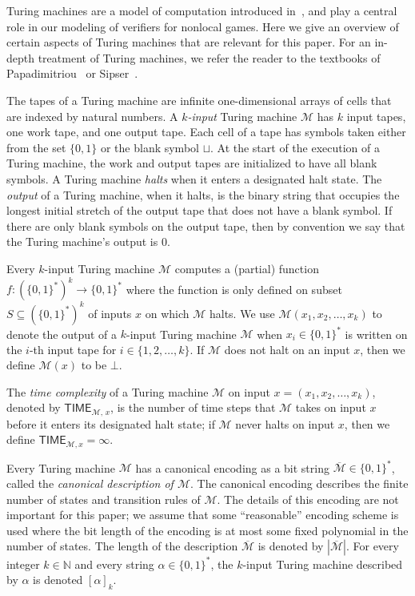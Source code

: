 \documentclass[11pt]{article}
\theoremstyle{definition}
\newcommand{\N}{\ensuremath{\mathbb{N}}}
\newcommand{\desc}[1]{\overline{\cal{#1}}}
\newcommand{\machine}{\cal{M}}
\renewcommand{\cal}[1]{\mathcal{#1}}
\newcommand{\TIME}{\mathsf{TIME}}
\begin{document}
Turing machines are a model of computation introduced
in~\cite{turing1937computable}, and play a central role in our modeling of verifiers for nonlocal
games. Here we give an overview of certain aspects of Turing machines that are relevant for
this paper. For an in-depth treatment of Turing machines, we refer the reader to the textbooks of 
Papadimitriou~\cite{Pap94} or Sipser~\cite{sipser2012introduction}.

The tapes of a Turing machine are infinite one-dimensional arrays of cells that
are indexed by natural numbers.
A \emph{$k$-input} Turing machine $\cal{M}$ has $k$ input tapes, one work tape,
and one output tape. 
Each cell of a tape has symbols taken either from the set $\{0,1\}$ or the blank
symbol $\sqcup$.
At the start of the execution of a Turing machine, the work and output tapes are
initialized to have all blank symbols.
A Turing machine \emph{halts} when it enters a designated halt state.
The \emph{output} of a Turing machine, when it halts, is the binary string that
occupies the longest initial stretch of the output tape that does not have a
blank symbol.
If there are only blank symbols on the output tape, then by convention we say
that the Turing machine's output is $0$.

Every $k$-input Turing machine $\cal{M}$ computes a (partial) function $f: (\{0,
1\}^*)^k \to \{0,1\}^*$ where the function is only defined on subset $S
\subseteq (\{0,1\}^*)^k$ of inputs $x$ on which $\machine$ halts.
We use $\cal{M}(x_1, x_2, \ldots, x_k)$ to denote the output of a $k$-input
Turing machine $\cal{M}$ when $x_i \in \{0,1\}^*$ is written on the $i$-th input
tape for $i \in \{1, 2, \ldots, k\}$.
If $\cal{M}$ does not halt on an input $x$, then we define $\cal{M}(x)$ to be
$\bot$.


The \emph{time complexity} of a Turing machine $\cal{M}$ on input $x = (x_1,
x_2, \ldots, x_k)$, denoted by $\TIME_{\cal{M},\, x}$, is the number of time
steps that $\cal{M}$ takes on input $x$ before it enters its designated halt
state; if $\cal{M}$ never halts on input $x$, then we define $\TIME_{\cal{M},x}
= \infty$.

Every Turing machine $\cal{M}$ has a canonical encoding as a bit string $\desc{\cal{M}} \in \{0, 1\}^*$, called
the \emph{canonical description of $\cal{M}$}. The canonical encoding describes the 
finite number of states and transition rules of $\cal{M}$. The details of this 
encoding are not important for this paper; we assume that some ``reasonable'' encoding scheme is
used where the bit length of the encoding is at most some fixed polynomial in the number of 
states. The length of the description
$\desc{\cal{M}}$ is denoted by $|\desc{\cal{M}}|$. 
For every integer $k \in \N$ and every string $\alpha \in \{0, 1\}^*$, the
$k$-input Turing machine described by $\alpha$ is denoted $[\alpha]_k$.
\end{document}
